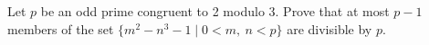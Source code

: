 Let $p$ be an odd prime congruent to 2 modulo 3. Prove that at most $p-1$ members of the set $\{m^2 - n^3 - 1 \mid 0 < m,\ n < p\}$ are divisible by $p$.